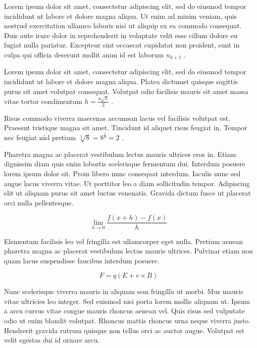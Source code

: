 \documentclass{article}
\begin{document}
	
   Lorem ipsum dolor sit amet, consectetur adipiscing elit, sed do eiusmod tempor incididunt ut labore et dolore magna aliqua. Ut enim ad minim veniam, quis nostrud exercitation ullamco laboris nisi ut aliquip ex ea commodo consequat. Duis aute irure dolor in reprehenderit in voluptate velit esse cillum dolore eu fugiat nulla pariatur. Excepteur sint occaecat cupidatat non proident, sunt in culpa qui officia deserunt mollit anim id est laborum 
   \begin{math}
    n_{k+1}
    \end{math}
    .
    \newline
    
    
    Lorem ipsum dolor sit amet, consectetur adipiscing elit, sed do eiusmod tempor incididunt ut labore et dolore magna aliqua. Platea dictumst quisque sagittis purus sit amet volutpat consequat. Volutpat odio facilisis mauris sit amet massa vitae tortor condimentum 
    $ h=\frac{a\sqrt{3}}{2} $
    .
    \newline
    
    Risus commodo viverra maecenas accumsan lacus vel facilisis volutpat est. Praesent tristique magna sit amet. Tincidunt id aliquet risus feugiat in. Tempor nec feugiat nisl pretium 
    \( \sqrt[3]{8}=8^{\frac{1}{3}}=2 \)
    .
    \newline
    
    Pharetra magna ac placerat vestibulum lectus mauris ultrices eros in. Etiam dignissim diam quis enim lobortis scelerisque fermentum dui. Interdum posuere lorem ipsum dolor sit. Proin libero nunc consequat interdum. Iaculis nunc sed augue lacus viverra vitae. Ut porttitor leo a diam sollicitudin tempor. Adipiscing elit ut aliquam purus sit amet luctus venenatis. Gravida dictum fusce ut placerat orci nulla pellentesque.
    
    \[ \lim_{h\to 0}\frac{f(x+h)-f(x)}{h}  \]
    
    Elementum facilisis leo vel fringilla est ullamcorper eget nulla. Pretium aenean pharetra magna ac placerat vestibulum lectus mauris ultrices. Pulvinar etiam non quam lacus suspendisse faucibus interdum posuere. 
    
    $$ F=q\left ( E+v \times B \right ) $$
    
    Nunc scelerisque viverra mauris in aliquam sem fringilla ut morbi. Mus mauris vitae ultricies leo integer. Sed euismod nisi porta lorem mollis aliquam ut. Ipsum a arcu cursus vitae congue mauris rhoncus aenean vel. Quis risus sed vulputate odio ut enim blandit volutpat. Rhoncus mattis rhoncus urna neque viverra justo. Hendrerit gravida rutrum quisque non tellus orci ac auctor augue. Volutpat est velit egestas dui id ornare arcu. 
    
\end{document}
